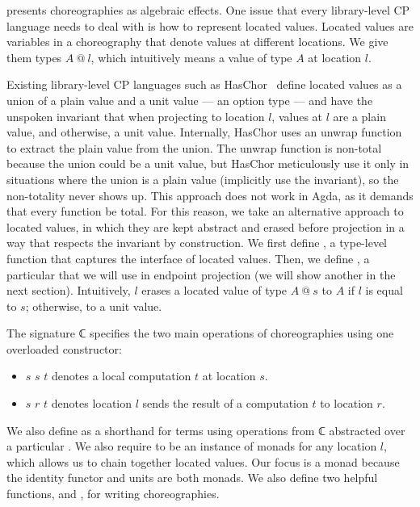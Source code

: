  presents choreographies as algebraic effects.
%
One issue that every library-level CP language needs to deal with is how to represent located values.
%
Located values are variables in a choreography that denote values at different locations.
%
We give them types $A \ @ \ l$, which intuitively means a value of type $A$ at location $l$.

Existing library-level CP languages such as HasChor~\citep{shen-2023} define located values as a union of a plain value and a unit value --- an option type --- and have the unspoken invariant that when projecting to location $l$, values at $l$ are a plain value, and otherwise, a unit value.
%
Internally, HasChor uses an unwrap function to extract the plain value from the union.
%
The unwrap function is non-total because the union could be a unit value, but HasChor meticulously use it only in situations where the union is a plain value (implicitly use the invariant), so the non-totality never shows up.
%
This approach does not work in Agda, as it demands that every function be total.
%
For this reason, we take an alternative approach to located values, in which they are kept abstract and erased before projection in a way that respects the invariant by construction.
%
We first define , a type-level function that captures the interface of located values.
%
Then, we define , a particular  that we will use in endpoint projection (we will show another  in the next section).
%
Intuitively,  $l$ erases a located value of type $A \ @ \ s$ to $A$ if $l$ is equal to $s$; otherwise, to a unit value.

The signature ℂ specifies the two main operations of choreographies using one overloaded constructor:
%
\begin{itemize}
\item
   $s$ $s$ $t$ denotes a local computation $t$ at location $s$.
\item
   $s$ $r$ $t$ denotes location $l$ sends the result of a computation $t$ to location $r$.
\end{itemize}

We also define  as a shorthand for terms using operations from ℂ abstracted over a particular .
%
We also require  to be an instance of monads for any location $l$, which allows us to chain together located values.
%
Our focus is a monad because the identity functor and units are both monads.
%
We also define two helpful functions,  and , for writing choreographies.

